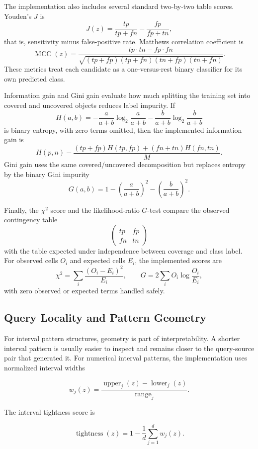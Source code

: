 \documentclass[11pt]{article}
\begin{document}
The implementation also includes several standard two-by-two table scores.
Youden's $J$ is
\[
    J(z)=\frac{tp}{tp+fn}-\frac{fp}{fp+tn},
\]
that is, sensitivity minus false-positive rate. Matthews correlation
coefficient is
\[
    \operatorname{MCC}(z)=
    \frac{tp\cdot tn - fp\cdot fn}
    {\sqrt{(tp+fp)(tp+fn)(tn+fp)(tn+fn)}}.
\]
These metrics treat each candidate as a one-versus-rest binary classifier
for its own predicted class.

Information gain and Gini gain evaluate how much splitting the training set
into covered and uncovered objects reduces label impurity. If
\[
    H(a,b)=-\frac{a}{a+b}\log_2\frac{a}{a+b}
           -\frac{b}{a+b}\log_2\frac{b}{a+b}
\]
is binary entropy, with zero terms omitted, then the implemented information
gain is
\[
    H(p,n) -
    \frac{(tp+fp)H(tp,fp)+(fn+tn)H(fn,tn)}{M}.
\]
Gini gain uses the same covered/uncovered decomposition but replaces entropy
by the binary Gini impurity
\[
    G(a,b)=1-\left(\frac{a}{a+b}\right)^2
             -\left(\frac{b}{a+b}\right)^2.
\]

Finally, the $\chi^2$ score and the likelihood-ratio $G$-test compare the
observed contingency table
\[
    \begin{pmatrix}
    tp & fp\\
    fn & tn
    \end{pmatrix}
\]
with the table expected under independence between coverage and class label.
For observed cells $O_i$ and expected cells $E_i$, the implemented scores are
\[
    \chi^2=\sum_i \frac{(O_i-E_i)^2}{E_i},
    \qquad
    G=2\sum_i O_i\log\frac{O_i}{E_i},
\]
with zero observed or expected terms handled safely.

\subsection{Query Locality and Pattern Geometry}

For interval pattern structures, geometry is part of interpretability. A
shorter interval pattern is usually easier to inspect and remains closer to
the query-source pair that generated it. For numerical interval patterns, the
implementation uses normalized interval widths

\[
    w_j(z) = \frac{\operatorname{upper}_j(z) - \operatorname{lower}_j(z)}
    {\operatorname{range}_j}.
\]

The interval tightness score is

\[
    \operatorname{tightness}(z) = 1 - \frac{1}{d}\sum_{j=1}^{d} w_j(z).
\]
\end{document}
